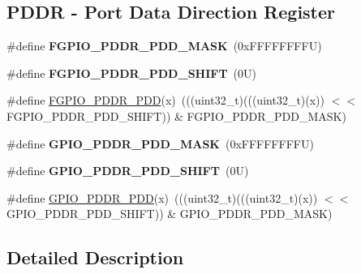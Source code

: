 \subsection*{P\+D\+DR -\/ Port Data Direction Register}
\begin{DoxyCompactItemize}
\item 
\mbox{\label{group___f_g_p_i_o___register___masks_gad20f346c1d3d80b99ea1dc94aa53898d}} 
\#define {\bfseries F\+G\+P\+I\+O\+\_\+\+P\+D\+D\+R\+\_\+\+P\+D\+D\+\_\+\+M\+A\+SK}~(0x\+F\+F\+F\+F\+F\+F\+F\+F\+U)
\item 
\mbox{\label{group___f_g_p_i_o___register___masks_gaae41c1c9d3ee91071f4f2a58b771754e}} 
\#define {\bfseries F\+G\+P\+I\+O\+\_\+\+P\+D\+D\+R\+\_\+\+P\+D\+D\+\_\+\+S\+H\+I\+FT}~(0\+U)
\item 
\#define \mbox{\hyperlink{group___f_g_p_i_o___register___masks_gae925ac53df59629914dc58fcf60d4480}{F\+G\+P\+I\+O\+\_\+\+P\+D\+D\+R\+\_\+\+P\+DD}}(x)~(((uint32\+\_\+t)(((uint32\+\_\+t)(x)) $<$$<$ F\+G\+P\+I\+O\+\_\+\+P\+D\+D\+R\+\_\+\+P\+D\+D\+\_\+\+S\+H\+I\+FT)) \& F\+G\+P\+I\+O\+\_\+\+P\+D\+D\+R\+\_\+\+P\+D\+D\+\_\+\+M\+A\+SK)
\item 
\mbox{\label{group___f_g_p_i_o___register___masks_ga67567a60f48d2bfb5584cd8de8936788}} 
\#define {\bfseries G\+P\+I\+O\+\_\+\+P\+D\+D\+R\+\_\+\+P\+D\+D\+\_\+\+M\+A\+SK}~(0x\+F\+F\+F\+F\+F\+F\+F\+F\+U)
\item 
\mbox{\label{group___f_g_p_i_o___register___masks_gacdd12c96f7650759c90a98bb606bd776}} 
\#define {\bfseries G\+P\+I\+O\+\_\+\+P\+D\+D\+R\+\_\+\+P\+D\+D\+\_\+\+S\+H\+I\+FT}~(0\+U)
\item 
\#define \mbox{\hyperlink{group___f_g_p_i_o___register___masks_ga9836cb3ac719630f741fe6a0292083fc}{G\+P\+I\+O\+\_\+\+P\+D\+D\+R\+\_\+\+P\+DD}}(x)~(((uint32\+\_\+t)(((uint32\+\_\+t)(x)) $<$$<$ G\+P\+I\+O\+\_\+\+P\+D\+D\+R\+\_\+\+P\+D\+D\+\_\+\+S\+H\+I\+FT)) \& G\+P\+I\+O\+\_\+\+P\+D\+D\+R\+\_\+\+P\+D\+D\+\_\+\+M\+A\+SK)
\end{DoxyCompactItemize}


\subsection{Detailed Description}


